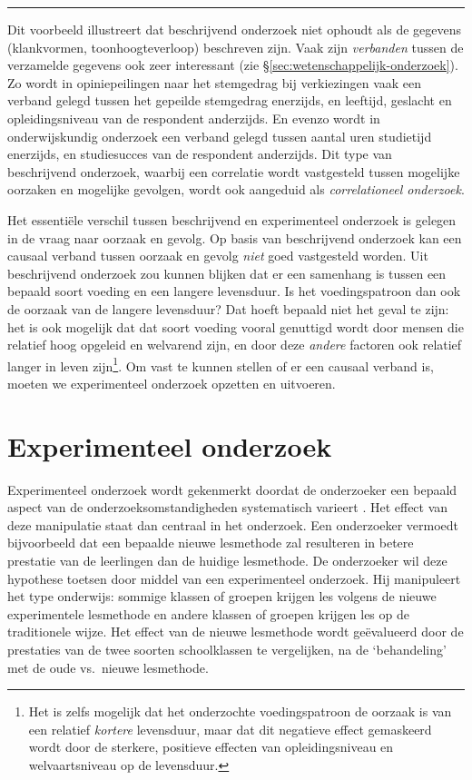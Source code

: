 \documentclass[
]{book}
\begin{document}
\begin{center}\rule{0.5\linewidth}{0.5pt}\end{center}

Dit voorbeeld illustreert dat beschrijvend onderzoek niet ophoudt als de
gegevens (klankvormen, toonhoogteverloop) beschreven zijn. Vaak zijn
\emph{verbanden} tussen de verzamelde gegevens ook zeer interessant (zie §\ref{sec:wetenschappelijk-onderzoek}).
Zo wordt in opiniepeilingen naar het stemgedrag bij verkiezingen vaak
een verband gelegd tussen het gepeilde stemgedrag enerzijds, en
leeftijd, geslacht en opleidingsniveau van de respondent anderzijds. En
evenzo wordt in onderwijskundig onderzoek een verband gelegd tussen
aantal uren studietijd enerzijds, en studiesucces van de respondent
anderzijds. Dit type van beschrijvend onderzoek, waarbij een correlatie
wordt vastgesteld tussen mogelijke oorzaken en mogelijke gevolgen, wordt
ook aangeduid als \emph{correlationeel onderzoek}.

Het essentiële verschil tussen beschrijvend en experimenteel onderzoek
is gelegen in de vraag naar oorzaak en gevolg. Op basis van beschrijvend
onderzoek kan een causaal verband tussen oorzaak en gevolg \emph{niet} goed
vastgesteld worden. Uit beschrijvend onderzoek zou kunnen blijken dat er
een samenhang is tussen een bepaald soort voeding en een langere
levensduur. Is het voedingspatroon dan ook de oorzaak van de langere
levensduur? Dat hoeft bepaald niet het geval te zijn: het is ook
mogelijk dat dat soort voeding vooral genuttigd wordt door mensen die
relatief hoog opgeleid en welvarend zijn, en door deze \emph{andere} factoren
ook relatief langer in leven zijn\footnote{Het is zelfs mogelijk dat het onderzochte voedingspatroon de oorzaak is van een relatief \emph{kortere} levensduur, maar dat dit negatieve effect gemaskeerd wordt door de sterkere, positieve effecten van opleidingsniveau en welvaartsniveau op de levensduur.}. Om vast te kunnen stellen of er
een causaal verband is, moeten we experimenteel onderzoek opzetten en
uitvoeren.

\section{Experimenteel onderzoek}\label{sec:experimenteel-onderzoek}

Experimenteel onderzoek wordt gekenmerkt doordat de onderzoeker een
bepaald aspect van de onderzoeksomstandigheden systematisch varieert
\citep{SCC02}. Het effect van deze manipulatie staat dan centraal in het
onderzoek. Een onderzoeker vermoedt bijvoorbeeld dat een bepaalde nieuwe
lesmethode zal resulteren in betere prestatie van de leerlingen dan de
huidige lesmethode. De onderzoeker wil deze hypothese toetsen door
middel van een experimenteel onderzoek. Hij manipuleert het type
onderwijs: sommige klassen of groepen krijgen les volgens de nieuwe
experimentele lesmethode en andere klassen of groepen krijgen les op de
traditionele wijze. Het effect van de nieuwe lesmethode wordt
geëvalueerd door de prestaties van de twee soorten schoolklassen te
vergelijken, na de `behandeling' met de oude vs.~nieuwe lesmethode.
\end{document}
